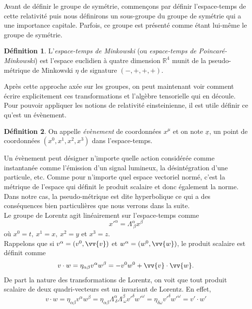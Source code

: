 \documentclass[a4paper,11pt]{report}
\theoremstyle{definition}
\theoremstyle{plain}
\theoremstyle{definition}
\newtheorem{defn}{Définition}[chapter]
\theoremstyle{remark}
\begin{document}
            Avant de définir le groupe de symétrie, commençons par définir l'espace-temps de cette relativité puis nous définirons un sous-groupe du groupe de symétrie qui a une importance capitale. Parfois, ce groupe est présenté comme étant lui-même le groupe de symétrie.
            
            \begin{defn}
                L'\textit{espace-temps de Minkowski} (ou \textit{espace-temps de Poincaré-Minkowski}) est l'espace euclidien à quatre dimension $\mathbb{R}^4$ munit de la pseudo-métrique de Minkowski $\eta$ de signature $(-,+,+,+)$.
            \end{defn}
            
            Après cette approche axée sur les groupes, on peut maintenant voir comment écrire explicitement ces transformations et l'algèbre tensorielle qui en découle.
            Pour pouvoir appliquer les notions de relativité einsteinienne, il est utile définir ce qu'est un évènement.
            \begin{defn}
                On appelle \textit{évènement} de coordonnées $x^\mu$ et on note $\underline{x}$, un point de coordonnées $(x^0,x^1,x^2,x^3)$ dans l'espace-temps.
            \end{defn}
            
            Un évènement peut désigner n'importe quelle action considérée comme instantanée comme l'émission d'un signal lumineux, la désintégration d'une particule, etc. Comme pour n'importe quel espace vectoriel normé, c'est la métrique de l'espace qui définit le produit scalaire et donc également la norme. Dans notre cas, la pseudo-métrique est dite hyperbolique ce qui a des conséquences bien particulières que nous verrons dans la suite.\\
            
            Le groupe de Lorentz agit linéairement sur l'espace-temps comme
            \begin{equation}
                x'^\alpha = \Lambda^\alpha_{~\beta}x^\beta
            \end{equation}
            où $x^0 = t, ~x^1 = x, ~x^2 = y$ et $x^3 = z$.\\
            Rappelons que si $v^\alpha = (v^0,\vv{v})$ et $w^\alpha = (w^0,\vv{w})$, le produit scalaire est définit comme
            \begin{equation}
                v\cdot w = \eta_{\alpha\beta}v^\alpha w^\beta = -v^0w^0+\vv{v}\cdot\vv{w}.
            \end{equation}
            De part la nature des transformations de Lorentz, on voit que tout produit scalaire de deux quadri-vecteurs est un invariant de Lorentz. En effet, 
            \begin{equation}
                v\cdot w = \eta_{\alpha\beta}v^\alpha w^\beta = \eta_{\alpha\beta} \Lambda^\alpha_{~\delta}  \Lambda^\beta_{~\omega} v'^\delta w'^\omega = \eta_{\delta\omega}  v'^\delta w'^\omega = v'\cdot w'
            \end{equation}
            
\end{document}
